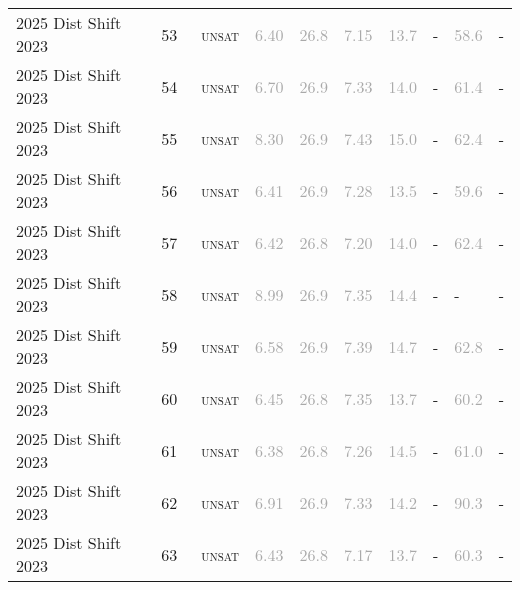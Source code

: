 \begin{center}
{\begin{longtable}{@{}llllllllll@{}}
2025 Dist Shift 2023 & 53 & ~\textsc{unsat} & \textcolor{darkgray}{6.40} & \textcolor{darkgray}{26.8} & \textcolor{darkgray}{7.15} & \textcolor{darkgray}{13.7} & - & \textcolor{darkgray}{58.6} & - \\
2025 Dist Shift 2023 & 54 & ~\textsc{unsat} & \textcolor{darkgray}{6.70} & \textcolor{darkgray}{26.9} & \textcolor{darkgray}{7.33} & \textcolor{darkgray}{14.0} & - & \textcolor{darkgray}{61.4} & - \\
2025 Dist Shift 2023 & 55 & ~\textsc{unsat} & \textcolor{darkgray}{8.30} & \textcolor{darkgray}{26.9} & \textcolor{darkgray}{7.43} & \textcolor{darkgray}{15.0} & - & \textcolor{darkgray}{62.4} & - \\
2025 Dist Shift 2023 & 56 & ~\textsc{unsat} & \textcolor{darkgray}{6.41} & \textcolor{darkgray}{26.9} & \textcolor{darkgray}{7.28} & \textcolor{darkgray}{13.5} & - & \textcolor{darkgray}{59.6} & - \\
2025 Dist Shift 2023 & 57 & ~\textsc{unsat} & \textcolor{darkgray}{6.42} & \textcolor{darkgray}{26.8} & \textcolor{darkgray}{7.20} & \textcolor{darkgray}{14.0} & - & \textcolor{darkgray}{62.4} & - \\
2025 Dist Shift 2023 & 58 & ~\textsc{unsat} & \textcolor{darkgray}{8.99} & \textcolor{darkgray}{26.9} & \textcolor{darkgray}{7.35} & \textcolor{darkgray}{14.4} & - & - & - \\
2025 Dist Shift 2023 & 59 & ~\textsc{unsat} & \textcolor{darkgray}{6.58} & \textcolor{darkgray}{26.9} & \textcolor{darkgray}{7.39} & \textcolor{darkgray}{14.7} & - & \textcolor{darkgray}{62.8} & - \\
2025 Dist Shift 2023 & 60 & ~\textsc{unsat} & \textcolor{darkgray}{6.45} & \textcolor{darkgray}{26.8} & \textcolor{darkgray}{7.35} & \textcolor{darkgray}{13.7} & - & \textcolor{darkgray}{60.2} & - \\
2025 Dist Shift 2023 & 61 & ~\textsc{unsat} & \textcolor{darkgray}{6.38} & \textcolor{darkgray}{26.8} & \textcolor{darkgray}{7.26} & \textcolor{darkgray}{14.5} & - & \textcolor{darkgray}{61.0} & - \\
2025 Dist Shift 2023 & 62 & ~\textsc{unsat} & \textcolor{darkgray}{6.91} & \textcolor{darkgray}{26.9} & \textcolor{darkgray}{7.33} & \textcolor{darkgray}{14.2} & - & \textcolor{darkgray}{90.3} & - \\
2025 Dist Shift 2023 & 63 & ~\textsc{unsat} & \textcolor{darkgray}{6.43} & \textcolor{darkgray}{26.8} & \textcolor{darkgray}{7.17} & \textcolor{darkgray}{13.7} & - & \textcolor{darkgray}{60.3} & - \\

\end{longtable}}
\end{center}
